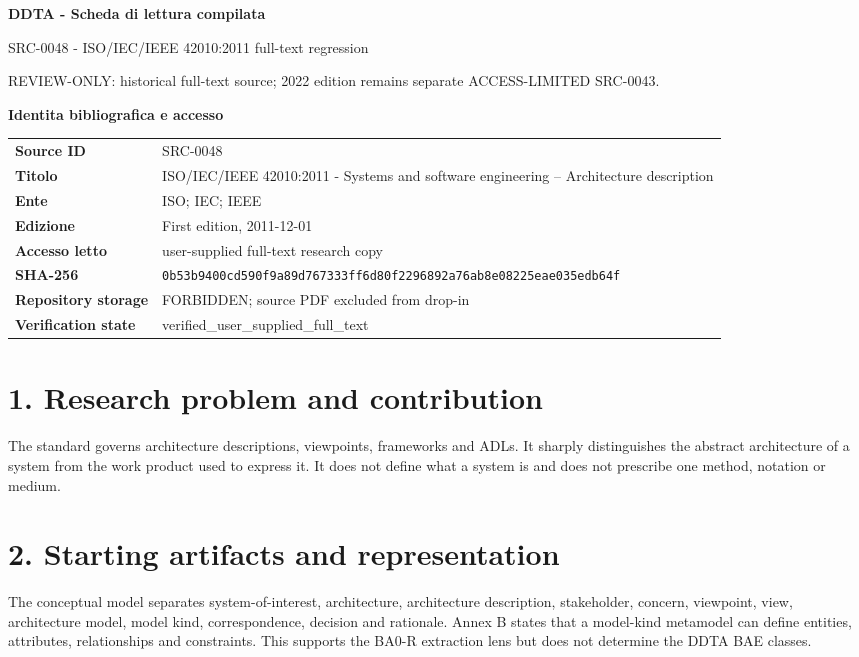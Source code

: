 \documentclass[10pt,a4paper]{article}
\newenvironment{factbox}[1]{\def\FrameCommand{\fcolorbox{ddtablue}{ddtagray}}\MakeFramed{\advance\hsize-2\width\FrameRestore}\noindent\textbf{#1}\par\smallskip}{\endMakeFramed}
\begin{document}
\begin{center}{\LARGE\bfseries DDTA - Scheda di lettura compilata}\par
{\large SRC-0048 - ISO/IEC/IEEE 42010:2011 full-text regression}\par
{\small REVIEW-ONLY: historical full-text source; 2022 edition remains separate ACCESS-LIMITED SRC-0043.}\par\end{center}
\begin{factbox}{Identita bibliografica e accesso}
\begin{tabularx}{\linewidth}{>{\bfseries}p{3.6cm}X}
Source ID & SRC-0048\\
Titolo & ISO/IEC/IEEE 42010:2011 - Systems and software engineering -- Architecture description\\
Ente & ISO; IEC; IEEE\\
Edizione & First edition, 2011-12-01\\
Accesso letto & user-supplied full-text research copy\\
SHA-256 & \texttt{0b53b9400cd590f9a89d767333ff6d80f2296892a76ab8e08225eae035edb64f}\\
Repository storage & FORBIDDEN; source PDF excluded from drop-in\\
Verification state & verified\_user\_supplied\_full\_text\\
\end{tabularx}
\end{factbox}
\section{1. Research problem and contribution}
The standard governs architecture descriptions, viewpoints, frameworks and ADLs. It sharply distinguishes the abstract architecture of a system from the work product used to express it. It does not define what a system is and does not prescribe one method, notation or medium.
\section{2. Starting artifacts and representation}
The conceptual model separates system-of-interest, architecture, architecture description, stakeholder, concern, viewpoint, view, architecture model, model kind, correspondence, decision and rationale. Annex B states that a model-kind metamodel can define entities, attributes, relationships and constraints. This supports the BA0-R extraction lens but does not determine the DDTA BAE classes.
\end{document}
